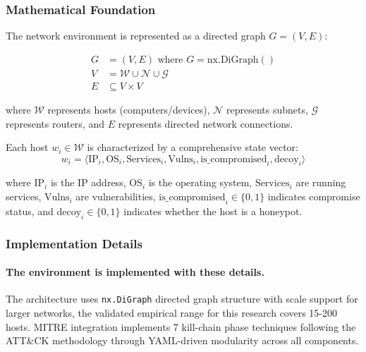 \documentclass[12pt,oneside]{article}
\begin{document}


\subsubsection{Mathematical Foundation}
The network environment is represented as a directed graph $G = (V, E)$:

\begin{align}
G &= (V, E) \text{ where } G = \text{nx.DiGraph}() \\
V &= \mathcal{W} \cup \mathcal{N} \cup \mathcal{G} \\
E &\subseteq V \times V
\end{align}

where $\mathcal{W}$ represents hosts (computers/devices), $\mathcal{N}$ represents subnets, $\mathcal{G}$ represents routers, and $E$ represents directed network connections.

Each host $w_i \in \mathcal{W}$ is characterized by a comprehensive state vector:
\begin{equation}
w_i = \langle \text{IP}_i, \text{OS}_i, \text{Services}_i, \text{Vulns}_i, \text{is\_compromised}_i, \text{decoy}_i \rangle
\end{equation}

where $\text{IP}_i$ is the IP address, $\text{OS}_i$ is the operating system, $\text{Services}_i$ are running services, $\text{Vulns}_i$ are vulnerabilities, $\text{is\_compromised}_i \in \{0,1\}$ indicates compromise status, and $\text{decoy}_i \in \{0,1\}$ indicates whether the host is a honeypot.

\subsubsection{Implementation Details}
\paragraph{The environment is implemented with these details.}The architecture uses \texttt{nx.DiGraph} directed graph structure with scale support for larger networks, the validated empirical range for this research covers 15-200 hosts. MITRE integration implements 7 kill-chain phase techniques following the ATT\&CK methodology through YAML-driven modularity across all components.
\end{document}
